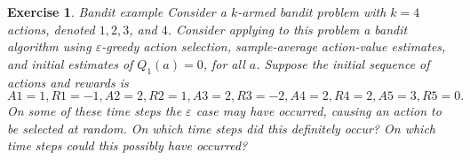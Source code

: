\documentclass[answers]{exam}
\newtheorem{exercise}[theorem]{Exercise}
\theoremstyle{definition}
\theoremstyle{remark}
\newcommand{\e}{\varepsilon}
\begin{document}
\begin{exercise}
Bandit example Consider a $k$-armed bandit problem with $k = 4$ actions, denoted $1, 2, 3$, and $4$. Consider applying to this problem a bandit algorithm using $\e$-greedy action selection, sample-average action-value estimates, and initial estimates of $Q_1(a) = 0$, for all $a$. Suppose the initial sequence of actions and rewards is $A1 = 1, R1 = -1, A2 = 2, R2 = 1, A3 = 2, R3 = -2, A4 = 2, R4 = 2, A5 = 3, R5 = 0.$ On some of these time steps the $\e$ case may have occurred, causing an action to be selected at random. On which time steps did this definitely occur? On which time steps could this possibly have occurred?
\end{exercise}
\end{document}
